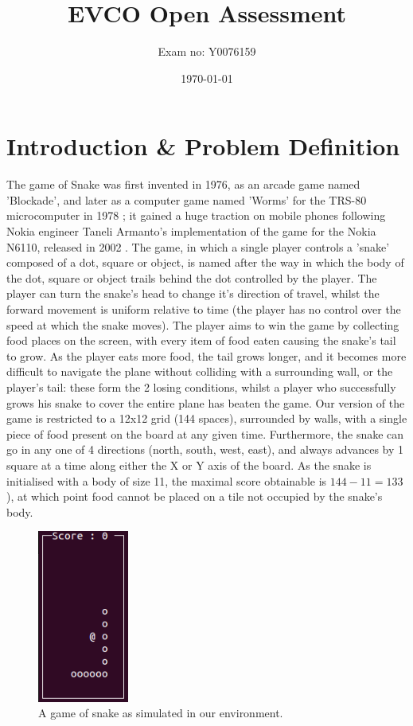 \documentclass[british,10pt,a4paper]{article}
\begin{document}
\title{EVCO Open Assessment}
\author{Exam no: Y0076159}
\date{\today}
\maketitle
\tableofcontents
\listoffigures
\clearpage
\section{Introduction \& Problem Definition}
The game of Snake was first invented in 1976, as an arcade game named 'Blockade', and later as a computer game named 'Worms' for the TRS-80 microcomputer in 1978 \cite{Goggin2010-ao}; it gained a huge traction on mobile phones following Nokia engineer Taneli Armanto's implementation of the game for the Nokia N6110, released in 2002 \cite{Goggin2010-ao}. The game, in which a single player controls a 'snake' composed of a dot, square or object, is named after the way in which the body of the dot, square or object trails behind the dot controlled by the player. The player can turn the snake's head to change it's direction of travel, whilst the forward movement is uniform relative to time (the player has no control over the speed at which the snake moves). The player aims to win the game by collecting food places on the screen, with every item of food eaten causing the snake's tail to grow. As the player eats more food, the tail grows longer, and it becomes more difficult to navigate the plane without colliding with a surrounding wall, or the player's tail: these form the 2 losing conditions, whilst a player who successfully grows his snake to cover the entire plane has beaten the game.  \newline
Our version of the game is restricted to a 12x12 grid (144 spaces), surrounded by walls, with a single piece of food present on the board at any given time. Furthermore, the snake can go in any one of 4 directions (north, south, west, east), and always advances by 1 square at a time along either the X or Y axis of the board. As the snake is initialised with a body of size 11, the maximal score obtainable is $144-11=133$), at which point food cannot be placed on a tile not occupied by the snake's body. 
\begin{figure}
\centering
	\includegraphics[width=3cm,keepaspectratio]{images/snake.png}
	\caption{A game of snake as simulated in our environment.}
	\label{fig:snake}
\end{figure}
\end{document}
